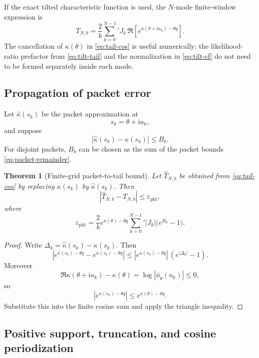 \documentclass[11pt]{article}
\newtheorem{theorem}{Theorem}[section]
\theoremstyle{definition}
\theoremstyle{remark}
\newcommand{\eps}{\varepsilon}
\newcommand{\ii}{\mathrm{i}}
\begin{document}
If the exact tilted characteristic function is used, the $N$-mode finite-window expression is
\begin{equation}
T_{N,b}
=\frac{2}{b}\sum_{k=0}^{N-1}{}'
J_k\,
\Re\left[e^{\kappa(\theta+\ii u_k)-\theta q}\right].
\label{eq:tail-cos}
\end{equation}
The cancellation of $\kappa(\theta)$ in \eqref{eq:tail-cos} is useful numerically: the likelihood-ratio prefactor from \eqref{eq:tilt-tail} and the normalization in \eqref{eq:tilt-cf} do not need to be formed separately inside each mode.

\subsection{Propagation of packet error}

Let $\widehat\kappa(s_k)$ be the packet approximation at
\[
s_k=\theta+\ii u_k,
\]
and suppose
\begin{equation}
|\widehat\kappa(s_k)-\kappa(s_k)|\le B_k.
\label{eq:Bk}
\end{equation}
For disjoint packets, $B_k$ can be chosen as the sum of the packet bounds \eqref{eq:packet-remainder}.

\begin{theorem}[Finite-grid packet-to-tail bound]
\label{thm:packet-tail}
Let $\widehat T_{N,b}$ be obtained from \eqref{eq:tail-cos} by replacing $\kappa(s_k)$ by $\widehat\kappa(s_k)$. Then
\begin{equation}
|\widehat T_{N,b}-T_{N,b}|
\le \eps_{\mathrm{pkt}},
\label{eq:packet-tail-bound}
\end{equation}
where
\begin{equation}
\eps_{\mathrm{pkt}}
=
\frac{2}{b}
 e^{\kappa(\theta)-\theta q}
\sum_{k=0}^{N-1}{}'
|J_k|\bigl(e^{B_k}-1\bigr).
\label{eq:eps-pkt}
\end{equation}
\end{theorem}

\begin{proof}
Write $\Delta_k=\widehat\kappa(s_k)-\kappa(s_k)$. Then
\[
|e^{\widehat\kappa(s_k)-\theta q}-e^{\kappa(s_k)-\theta q}|
\le
|e^{\kappa(s_k)-\theta q}|\,(e^{|\Delta_k|}-1).
\]
Moreover
\[
\Re\kappa(\theta+\ii u_k)-\kappa(\theta)
=\log|\phi_{\theta}(u_k)|\le0,
\]
so
\[
|e^{\kappa(s_k)-\theta q}|
\le e^{\kappa(\theta)-\theta q}.
\]
Substitute this into the finite cosine sum and apply the triangle inequality.
\end{proof}

\subsection{Positive support, truncation, and cosine periodization}
\end{document}
